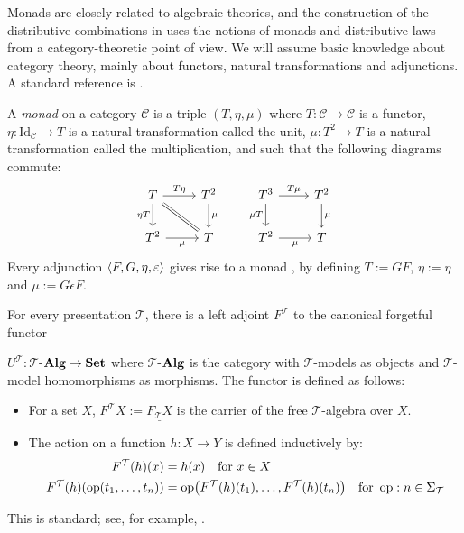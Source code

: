 Monads are closely related to algebraic theories, and the construction of the distributive combinations in  uses the notions of monads and distributive laws from a category-theoretic point of view. We will assume basic knowledge about category theory, mainly about functors, natural transformations and adjunctions. A standard reference is \textcite{maclane}.

A \emph{monad} on a category $\mathcal{C}$ is a triple $(T, \eta, \mu)$ where $T: \mathcal{C} \to \mathcal{C}$ is a functor, $\eta: \text{Id}_{\mathcal{C}} \to T$ is a natural transformation called the unit, $\mu: T^2 \to T$ is a natural transformation called the multiplication, and such that the following diagrams commute:
  \[
  \begin{tikzcd}
    T \arrow[r, "T\eta"] \arrow[d, "\eta T"'] \arrow[equal, dr, ""] & T^2 \arrow[d, "\mu"] \\
    T^2 \arrow[r, "\mu"'] & T
  \end{tikzcd}
  \quad\quad
  \begin{tikzcd}
    T^3 \arrow[r, "T\mu"] \arrow[d, "\mu T"'] & T^2 \arrow[d, "\mu"] \\
    T^2 \arrow[r, "\mu"'] & T
  \end{tikzcd}
  \]
Every adjunction $\left\langle F, G, \eta, \varepsilon \right\rangle$ gives rise to a monad \parencite{maclane}, by defining $T := GF$, $\eta := \eta$ and $\mu := G \epsilon F$.

\begin{theorem}
  For every presentation $\mathcal T$, there is a left adjoint $F^\mathcal{T}$ to the canonical forgetful functor 

  \noindent $U^\mathcal{T} : \mathcal{T}$-$\mathbf{Alg} \to \mathbf{Set}$ where $\mathcal{T}$-$\mathbf{Alg}$ is the category with $\mathcal{T}$-models as objects and $\mathcal{T}$-model homomorphisms as morphisms. The functor is defined as follows:
  \begin{itemize}
    \item For a set $X$, $F^\mathcal{T} X := \underline{F_\mathcal{T} X}$ is the carrier of the free $\mathcal{T}$-algebra over $X$.
    \item The action on a function $h : X \to Y$ is defined inductively by:
    \begin{align*}
      F^\mathcal{T}(h)(x) &= h(x) \quad \text{for } x \in X\\
      F^\mathcal{T}(h)(\operatorname{op}(t_1, \dots, t_n)) &= \operatorname{op}\bigr(F^\mathcal{T}(h)(t_1), \dots, F^\mathcal{T}(h)(t_n)\bigl) \quad \text{for } \operatorname{op} : n \in \Sigma_\mathcal{T}
    \end{align*} 
  \end{itemize}
\end{theorem}
This is standard; see, for example, \textcite{nogo_distributive_law}.

